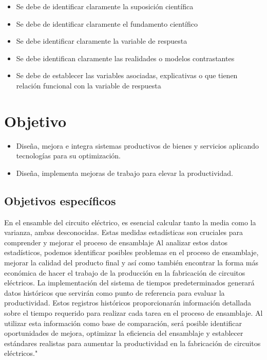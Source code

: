     \begin{itemize}
     \item Se debe de identificar claramente la suposición científica
    \item Se debe de identificar claramente el fundamento científico
    \item Se debe identificar claramente la variable de respuesta
    \item Se debe identifican claramente las realidades o modelos contrastantes
    \item Se debe de establecer las variables asociadas, explicativas o que tienen relación funcional con la variable de respuesta
    \end{itemize}
    \section{Objetivo}
    
    \begin{itemize}
        \item Diseña, mejora e integra sistemas productivos de bienes y servicios aplicando tecnologías para su optimización.
        \item Diseña, implementa mejoras de trabajo para elevar la productividad.
    \end{itemize}
    
    \subsection{Objetivos específicos }
    
    En el ensamble del circuito eléctrico, es esencial calcular tanto la media como la varianza, ambas desconocidas. Estas medidas estadísticas son cruciales para comprender y mejorar el proceso de ensamblaje Al analizar estos datos estadísticos, podemos identificar posibles problemas en el proceso de ensamblaje, mejorar la calidad del producto final y así como también encontrar la forma más económica de hacer el trabajo de la producción en la fabricación de circuitos eléctricos.
    La implementación del sistema de tiempos predeterminados generará datos históricos que servirán como punto de referencia para evaluar la productividad. Estos registros históricos proporcionarán información detallada sobre el tiempo requerido para realizar cada tarea en el proceso de ensamblaje. Al utilizar esta información como base de comparación, será posible identificar oportunidades de mejora, optimizar la eficiencia del ensamblaje y establecer estándares realistas para aumentar la productividad en la fabricación de circuitos eléctricos."
